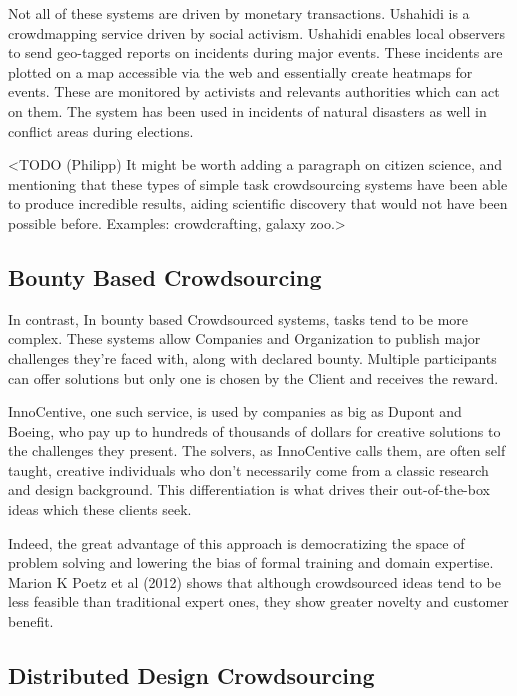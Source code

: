 Not all of these systems are driven by monetary transactions. Ushahidi\cite{ushahidi} is a crowdmapping service driven by social activism. Ushahidi enables local observers to send geo-tagged reports on incidents during major events. These incidents are plotted on a map accessible via the web and essentially create heatmaps for events. These are monitored by activists and relevants authorities which can act on them. The system has been used in incidents of natural disasters as well in conflict areas during elections. 

<TODO (Philipp) It might be worth adding a paragraph on citizen science, and mentioning that these types of simple task crowdsourcing systems have been able to produce incredible results, aiding scientific discovery that would not have been possible before. Examples: crowdcrafting, galaxy zoo.>

\subsection{Bounty Based Crowdsourcing}

In contrast, In bounty based Crowdsourced systems, tasks tend to be more complex. These systems allow Companies and Organization to publish major challenges they're faced with, along with declared bounty. Multiple participants can offer solutions but only one is chosen by the Client and receives the reward.   

InnoCentive\cite{innocentive}, one such service, is used by companies as big as Dupont and Boeing, who pay up to hundreds of thousands of dollars for creative solutions to the challenges they present. The solvers, as InnoCentive calls them, are often self taught, creative individuals who don't necessarily come from a classic research and design background. This differentiation is what drives their out-of-the-box ideas which these clients seek. \cite{howe2006rise}

Indeed, the great advantage of this approach is democratizing the space of problem solving and lowering the bias of formal training and domain expertise. Marion K Poetz et al (2012) shows that although crowdsourced ideas tend to be less feasible than traditional expert ones, they show greater novelty and customer benefit. 

\subsection{Distributed Design Crowdsourcing}

